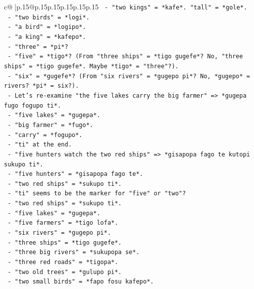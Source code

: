 \documentclass{article}
\begin{document}
{\begin{supertabular}{c@{$\;$}|p{.15\linewidth}@{}p{.15\linewidth}p{.15\linewidth}p{.15\linewidth}p{.15\linewidth}p{.15\linewidth}}
{{{\texttt{          {-} "two kings" = *kafe*. "tall" = *gole*.} \\
\texttt{          {-} "two birds" = *logi*.} \\
\texttt{          {-} "a bird" = *logipo*.} \\
\texttt{          {-} "a king" = *kafepo*.} \\
\texttt{          {-} "three" = *pi*?} \\
\texttt{          {-} "five" = *tigo*? (From "three ships" = *tigo gugefe*? No, "three ships" = *tigo gugefe*. Maybe *tigo* = "three"?).} \\
\texttt{          {-} "six" = *gugefe*? (From "six rivers" = *gugepo pi*? No, *gugepo* = rivers? *pi* = six?).} \\
\texttt{          {-} Let's re{-}examine "the five lakes carry the big farmer" => *gugepa fugo fogupo ti*.} \\
\texttt{          {-} "five lakes" = *gugepa*.} \\
\texttt{          {-} "big farmer" = *fugo*.} \\
\texttt{          {-} "carry" = *fogupo*.} \\
\texttt{          {-} "ti" at the end.} \\
\texttt{          {-} "five hunters watch the two red ships" => *gisapopa fago te kutopi sukupo ti*.} \\
\texttt{          {-} "five hunters" = *gisapopa fago te*.} \\
\texttt{          {-} "two red ships" = *sukupo ti*.} \\
\texttt{          {-} "ti" seems to be the marker for "five" or "two"?} \\
\texttt{          {-} "two red ships" = *sukupo ti*.} \\
\texttt{          {-} "five lakes" = *gugepa*.} \\
\texttt{          {-} "five farmers" = *tigo lofa*.} \\
\texttt{          {-} "six rivers" = *gugepo pi*.} \\
\texttt{          {-} "three ships" = *tigo gugefe*.} \\
\texttt{          {-} "three big rivers" = *sukupopa se*.} \\
\texttt{          {-} "three red roads" = *tigopa*.} \\
\texttt{          {-} "two old trees" = *gulupo pi*.} \\
\texttt{          {-} "two small birds" = *fapo fosu kafepo*.} \\
}}}
\end{supertabular}}
\end{document}
